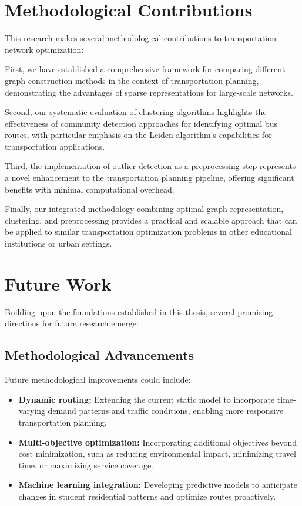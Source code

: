 \section{Methodological Contributions}

This research makes several methodological contributions to transportation network optimization:

First, we have established a comprehensive framework for comparing different graph construction methods in the context of transportation planning, demonstrating the advantages of sparse representations for large-scale networks.

Second, our systematic evaluation of clustering algorithms highlights the effectiveness of community detection approaches for identifying optimal bus routes, with particular emphasis on the Leiden algorithm's capabilities for transportation applications.

Third, the implementation of outlier detection as a preprocessing step represents a novel enhancement to the transportation planning pipeline, offering significant benefits with minimal computational overhead.

Finally, our integrated methodology combining optimal graph representation, clustering, and preprocessing provides a practical and scalable approach that can be applied to similar transportation optimization problems in other educational institutions or urban settings.

\section{Future Work}

Building upon the foundations established in this thesis, several promising directions for future research emerge:

\subsection{Methodological Advancements}

Future methodological improvements could include:

\begin{itemize}
    \item \textbf{Dynamic routing:} Extending the current static model to incorporate time-varying demand patterns and traffic conditions, enabling more responsive transportation planning.
    
    \item \textbf{Multi-objective optimization:} Incorporating additional objectives beyond cost minimization, such as reducing environmental impact, minimizing travel time, or maximizing service coverage.
    
    \item \textbf{Machine learning integration:} Developing predictive models to anticipate changes in student residential patterns and optimize routes proactively.
\end{itemize}

